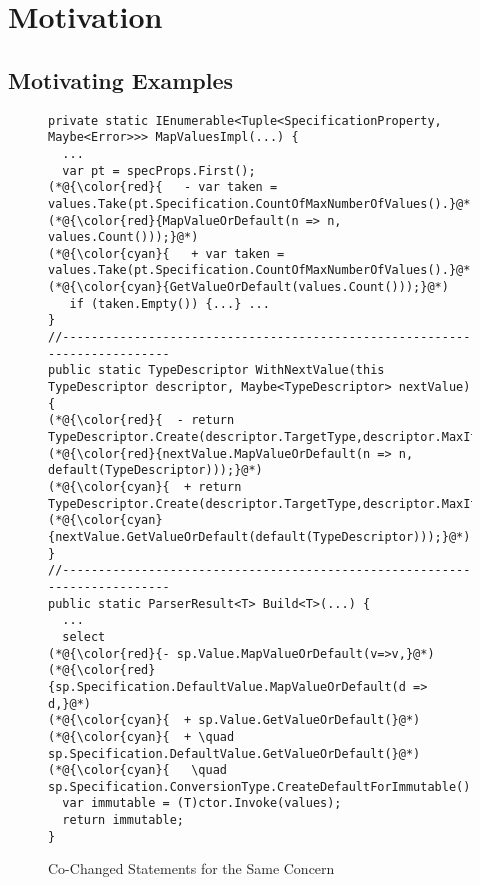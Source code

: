 \section{Motivation}
\label{motiv:sec}

\subsection{Motivating Examples}
\label{exe:sec}



\begin{figure}[t]
	\centering
	\begin{lstlisting}[]
private static IEnumerable<Tuple<SpecificationProperty, Maybe<Error>>> MapValuesImpl(...) {
  ...
  var pt = specProps.First();
(*@{\color{red}{   - var taken = values.Take(pt.Specification.CountOfMaxNumberOfValues().}@*) (*@{\color{red}{MapValueOrDefault(n => n, values.Count()));}@*)
(*@{\color{cyan}{   + var taken = values.Take(pt.Specification.CountOfMaxNumberOfValues().}@*) (*@{\color{cyan}{GetValueOrDefault(values.Count()));}@*)
   if (taken.Empty()) {...} ...
}
//--------------------------------------------------------------------------
public static TypeDescriptor WithNextValue(this TypeDescriptor descriptor, Maybe<TypeDescriptor> nextValue) {
(*@{\color{red}{  - return TypeDescriptor.Create(descriptor.TargetType,descriptor.MaxItems,}@*) (*@{\color{red}{nextValue.MapValueOrDefault(n => n, default(TypeDescriptor)));}@*)
(*@{\color{cyan}{  + return TypeDescriptor.Create(descriptor.TargetType,descriptor.MaxItems,}@*) (*@{\color{cyan}{nextValue.GetValueOrDefault(default(TypeDescriptor)));}@*)
}
//--------------------------------------------------------------------------
public static ParserResult<T> Build<T>(...) {
  ...
  select
(*@{\color{red}{- sp.Value.MapValueOrDefault(v=>v,}@*) (*@{\color{red}{sp.Specification.DefaultValue.MapValueOrDefault(d => d,}@*)
(*@{\color{cyan}{  + sp.Value.GetValueOrDefault(}@*)
(*@{\color{cyan}{  + \quad sp.Specification.DefaultValue.GetValueOrDefault(}@*)
(*@{\color{cyan}{   \quad  sp.Specification.ConversionType.CreateDefaultForImmutable()))).ToArray();}@*)
  var immutable = (T)ctor.Invoke(values);
  return immutable;
}
	\end{lstlisting}
        \vspace{-15pt}
        \caption{Co-Changed Statements for the Same Concern}
        \vspace{-6pt}
        \label{fig:motiv-cc}
\end{figure}

